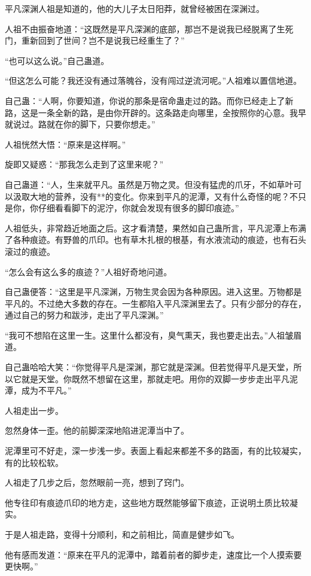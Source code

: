 \begin{this_body}
平凡深渊人祖是知道的，他的大儿子太日阳莽，就曾经被困在深渊过。

人祖不由振奋地道：“这既然是平凡深渊的底部，那岂不是说我已经脱离了生死门，重新回到了世间？岂不是说我已经重生了？”

“也可以这么说。”自己蛊道。

“但这怎么可能？我还没有通过落魄谷，没有闯过逆流河呢。”人祖难以置信地道。

自己蛊：“人啊，你要知道，你说的那条是宿命蛊走过的路。而你已经走上了新路，这是一条全新的路，是由你开辟的。这条路走向哪里，全按照你的心意。我早就说过。路就在你的脚下，只要你想走。”

人祖恍然大悟：“原来是这样啊。”

旋即又疑惑：“那我怎么走到了这里来呢？”

自己蛊道：“人，生来就平凡。虽然是万物之灵。但没有猛虎的爪牙，不如草叶可以汲取大地的营养，没有**的变化。你来到平凡的泥潭，又有什么奇怪的呢？不只是你，你仔细看看脚下的泥泞，你就会发现有很多的脚印痕迹。”

人祖低头，非常趋近地面之后。这才看清楚，果然如自己蛊所言，平凡泥潭上布满了各种痕迹。有野兽的爪印。也有草木扎根的根基，有水液流动的痕迹，也有石头滚过的痕迹。

“怎么会有这么多的痕迹？”人祖好奇地问道。

自己蛊便答：“这里是平凡深渊，万物生灵会因为各种原因。进入这里。万物都是平凡的。不过绝大多数的存在。一生都陷入平凡深渊里去了。只有少部分的存在，通过自己的努力和跋涉，走出了平凡深渊。”

“我可不想陷在这里一生。这里什么都没有，臭气熏天，我也要走出去。”人祖皱眉道。

自己蛊哈哈大笑：“你觉得平凡是深渊，那它就是深渊。但若觉得平凡是天堂，所以它就是天堂。你既然不想留在这里，那就走吧。用你的双脚一步步走出平凡泥潭，成为不平凡。”

人祖走出一步。

忽然身体一歪。他的前脚深深地陷进泥潭当中了。

泥潭里可不好走，深一步浅一步。表面上看起来都差不多的路面，有的比较凝实，有的比较松软。

人祖走了几步之后，忽然眼前一亮，想到了窍门。

他专往印有痕迹爪印的地方走，这些地方既然能够留下痕迹，正说明土质比较凝实。

于是人祖走路，变得十分顺利，和之前相比，简直是健步如飞。

他有感而发道：“原来在平凡的泥潭中，踏着前者的脚步走，速度比一个人摸索要更快啊。”


\end{this_body}

